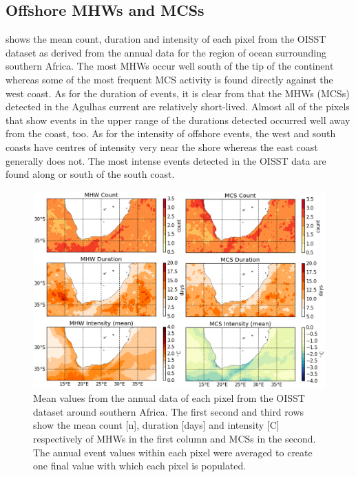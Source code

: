 \documentclass[a4paper,10pt,review]{elsarticle}
\begin{document}
\subsection{Offshore MHWs and MCSs}
 shows the mean count, duration and intensity of each pixel from the OISST dataset as derived from the annual data for the region of ocean surrounding southern Africa. The most MHWs occur well south of the tip of the continent whereas some of the most frequent MCS activity is found directly against the west coast. As for the duration of events, it is clear from  that the MHWs (MCSs) detected in the Agulhas current are relatively short-lived. Almost all of the pixels that show events in the upper range of the durations detected occurred well away from the coast, too. As for the intensity of offshore events, the west and south coasts have centres of intensity very near the shore whereas the east coast generally does not. The most intense events detected in the OISST data are found along or south of the south coast.

\begin{figure}
\centering \includegraphics[width=1.0\textwidth]{MHW_MCS_mean.png}
\caption{Mean values from the annual data of each pixel from the OISST dataset around southern Africa. The first second and third rows show the mean count [n], duration [days] and intensity [\degree C] respectively of MHWs in the first column and MCSs in the second. The annual event values within each pixel were averaged to create one final value with which each pixel is populated.}
\label{fig:Figure6}
\end{figure}
\end{document}
